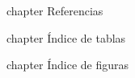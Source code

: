 \documentclass[a4paper,12pt,proyecto]{iietesis}
\begin{document}
\backmatter


\newpage{} {chapter} {Referencias}%



\newpage{} {chapter} {\'Indice de tablas}%
\listoftables %

\newpage\newpage{} {chapter} {\'Indice de figuras}%
\listoffigures %




\lastpage
\end{document}
